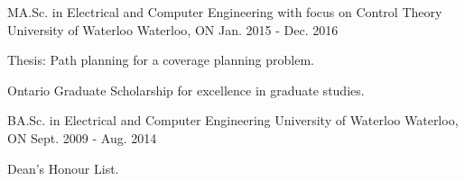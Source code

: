 

\begin{cventries}

  \cventry
    {MA.Sc. in Electrical and Computer Engineering with focus on Control Theory} %
    {University of Waterloo} %
    {Waterloo, ON} %
    {Jan. 2015 - Dec. 2016} %
    {
      \begin{cvitems} %
        \item {Thesis: Path planning for a coverage planning problem.}
        \item {Ontario Graduate Scholarship for excellence in graduate studies.}
      \end{cvitems}
    }

  \cventry
    {BA.Sc. in Electrical and Computer Engineering} %
    {University of Waterloo} %
    {Waterloo, ON} %
    {Sept. 2009 - Aug. 2014} %
    {
      \begin{cvitems} %
        \item {Dean's Honour List.}
      \end{cvitems}
    }
\end{cventries}

